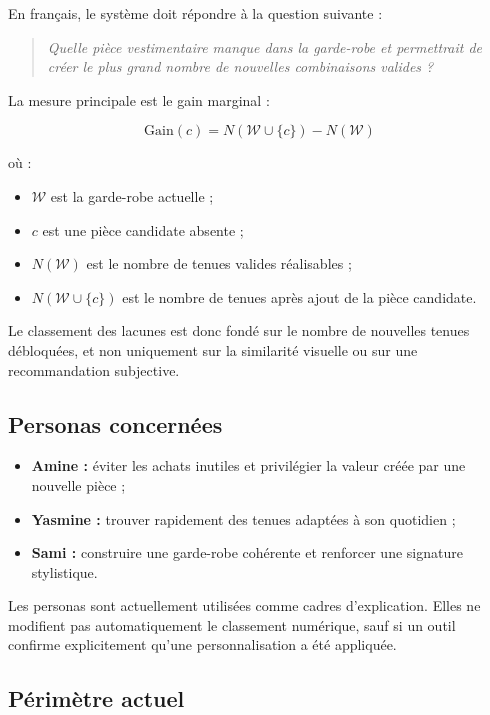 \documentclass[11pt,a4paper]{article}
\begin{document}
En français, le système doit répondre à la question suivante :

\begin{quote}
\textit{Quelle pièce vestimentaire manque dans la garde-robe et permettrait
de créer le plus grand nombre de nouvelles combinaisons valides ?}
\end{quote}

La mesure principale est le gain marginal :

\[
\mathrm{Gain}(c)
=
N(\mathcal{W}\cup\{c\})-N(\mathcal{W})
\]

où :

\begin{itemize}[leftmargin=*]
    \item $\mathcal{W}$ est la garde-robe actuelle ;
    \item $c$ est une pièce candidate absente ;
    \item $N(\mathcal{W})$ est le nombre de tenues valides réalisables ;
    \item $N(\mathcal{W}\cup\{c\})$ est le nombre de tenues après ajout de la
    pièce candidate.
\end{itemize}

Le classement des lacunes est donc fondé sur le nombre de nouvelles tenues
débloquées, et non uniquement sur la similarité visuelle ou sur une
recommandation subjective.

\subsection{Personas concernées}

\begin{itemize}[leftmargin=*]
    \item \textbf{Amine :} éviter les achats inutiles et privilégier la valeur
    créée par une nouvelle pièce ;
    \item \textbf{Yasmine :} trouver rapidement des tenues adaptées à son
    quotidien ;
    \item \textbf{Sami :} construire une garde-robe cohérente et renforcer une
    signature stylistique.
\end{itemize}

Les personas sont actuellement utilisées comme cadres d'explication. Elles ne
modifient pas automatiquement le classement numérique, sauf si un outil
confirme explicitement qu'une personnalisation a été appliquée.

\subsection{Périmètre actuel}
\end{document}
